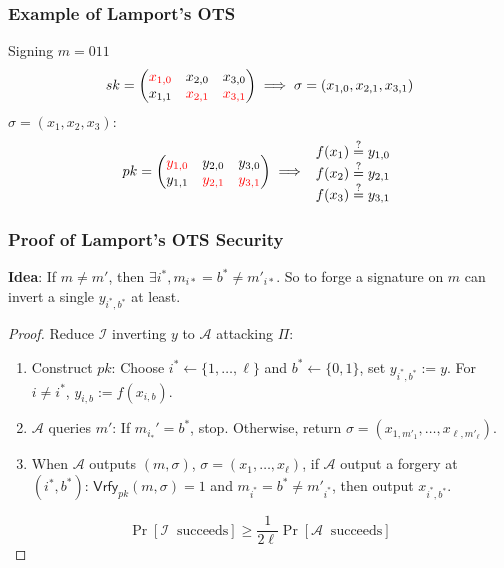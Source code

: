 \begin{frame}\frametitle{Example of Lamport's OTS}
\begin{exampleblock}{Signing $m=011$}
\[ sk =
\begin{pmatrix} {\color{red} x_{1,0}} & x_{2,0} & x_{3,0} \\
x_{1,1} & {\color{red} x_{2,1}} & {\color{red} x_{3,1}} 
\end{pmatrix}
\implies \sigma = (x_{1,0},x_{2,1},x_{3,1})\]
$\sigma = (x_1,x_2,x_3)$:
\[ pk =
\begin{pmatrix} {\color{red} y_{1,0}} & y_{2,0} & y_{3,0} \\
y_{1,1} & {\color{red} y_{2,1}} & {\color{red} y_{3,1}} 
\end{pmatrix}
\implies \begin{array}{l} f(x_1) \overset{?}{=} y_{1,0} \\ f(x_2) \overset{?}{=} y_{2,1} \\ f(x_3) \overset{?}{=} y_{3,1} \end{array} \]
\end{exampleblock}
\end{frame}
\begin{frame}\frametitle{Proof of Lamport's OTS Security}
\textbf{Idea}: If $m \neq m'$, then $\exists i^*, m_{i*} = b^* \neq m'_{i*}$. So to forge a signature on $m$ can invert a single $y_{i^*,b^*}$ at least.
\begin{proof}
Reduce $\mathcal{I}$ inverting $y$ to $\mathcal{A}$ attacking $\Pi$:
\begin{enumerate}
\item Construct $pk$: Choose $i^* \gets \{1,\dotsc,\ell\}$ and $b^* \gets \{0,1\}$, set $y_{i^*,b^*} := y$. For $i \neq i^*$, $y_{i,b} := f(x_{i,b})$.
\item $\mathcal{A}$ queries $m'$: If $m_{i_*}' = b^*$, stop. Otherwise, return $\sigma = (x_{1,m'_1},\dots,x_{\ell,m'_{\ell}})$.
\item When $\mathcal{A}$ outputs $(m,\sigma)$, $\sigma=(x_1,\dotsc,x_{\ell})$, if $\mathcal{A}$ output a forgery at $(i^*,b^*)$: $\mathsf{Vrfy}_{pk}(m,\sigma)=1$ and $m_{i^*} =b^* \neq m'_{i^*}$, then output $x_{i^*,b^*}$.
\end{enumerate}
\[\Pr[\mathcal{I}\;\; \text{succeeds} ] \ge \frac{1}{2\ell}\Pr[\mathcal{A}\;\;  \text{succeeds}] \]
\end{proof}
\end{frame}
